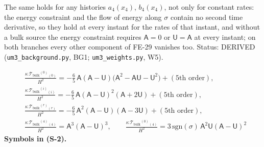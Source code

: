 \documentclass[
  10pt,
]{article}
\begin{document}
The same holds for any histories \(a_4(x_4)\), \(b_4(x_4)\), not only
for constant rates: the energy constraint and the flow of energy along
\(\sigma\) contain no second time derivative, so they hold at every
instant for the rates of that instant, and without a bulk source the
energy constraint requires \(\mathsf{A} = 0\) or
\(\mathsf{U} = \mathsf{A}\) at every instant; on both branches every
other component of FE-29 vanishes too. Status: DERIVED
(\texttt{um3\_background.py}, BG1; \texttt{um3\_weights.py}, W5).

\[
\begin{aligned}
&\frac{\kappa\,\mathcal{T}_{\mathrm{bulk}}{}^{(0)}{}_{(0)}}{H^2} = -\frac65\,\mathsf{A}(\mathsf{A} - \mathsf{U})\big(\mathsf{A}^2 - \mathsf{A}\mathsf{U} - \mathsf{U}^2\big)
 + (\text{5th order}),\\
&\frac{\kappa\,\mathcal{T}_{\mathrm{bulk}}{}^{(i)}{}_{(i)}}{H^2} = -\frac65\,\mathsf{A}(\mathsf{A} - \mathsf{U})^2(\mathsf{A} + 2\mathsf{U}) + (\text{5th order}),\\
&\frac{\kappa\,\mathcal{T}_{\mathrm{bulk}}{}^{(r)}{}_{(r)}}{H^2} = -\frac65\,\mathsf{A}^2(\mathsf{A} - \mathsf{U})(\mathsf{A} - 3\mathsf{U}) + (\text{5th order}),\\
&\frac{\kappa\,\mathcal{T}_{\mathrm{bulk}}{}^{(4)}{}_{(4)}}{H^2} = \mathsf{A}^3(\mathsf{A} - \mathsf{U})^3,\qquad
 \frac{\kappa\,\mathcal{T}_{\mathrm{bulk}}{}^{(0)}{}_{(4)}}{H^2} = 3\,\mathrm{sgn}(\sigma)\,\mathsf{A}^2\mathsf{U}(\mathsf{A} - \mathsf{U})^2
\end{aligned} \tag{S-2}
\] \textbf{Symbols in (S-2).}
\end{document}
